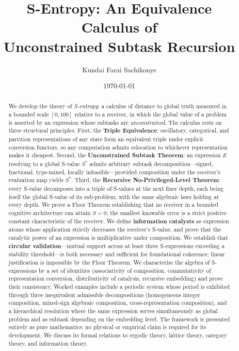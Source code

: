 \documentclass[11pt,a4paper]{article}
\title{\Large\textbf{S-Entropy: An Equivalence Calculus of\\
Unconstrained Subtask Recursion}}
\author{Kundai Farai Sachikonye}
\date{\today}
\theoremstyle{thmstyle}
\theoremstyle{thmstyle}
\theoremstyle{definition}
\theoremstyle{remark}
\newcommand{\Sscalar}{S}
\begin{document}
\maketitle

\begin{abstract}
We develop the theory of \emph{S-entropy}: a calculus of
distance to global truth measured in a bounded scale $[0,100]$
relative to a receiver, in which the global value of a problem
is asserted by an expression whose subtasks are \emph{unconstrained}.
The calculus rests on three structural principles. First, the
\textbf{Triple Equivalence}: oscillatory, categorical, and
partition representations of any state form an equivalent
triple under explicit conversion functors, so any computation
admits relocation to whichever representation makes it cheapest.
Second, the \textbf{Unconstrained Subtask Theorem}: an expression
$E$ resolving to a global S-value $\Sscalar^{*}$ admits arbitrary
subtask decomposition---signed, fractional, type-mixed,
locally infeasible---provided composition under the receiver's
evaluation map yields $\Sscalar^{*}$. Third, the
\textbf{Recursive No-Privileged-Level Theorem}: every S-value
decomposes into a triple of S-values at the next finer depth,
each being itself the global S-value of its sub-problem,
with the same algebraic laws holding at every depth. We
prove a Floor Theorem establishing that no receiver in a
bounded cognitive architecture can attain $\Sscalar = 0$;
the smallest knowable error is a strict positive constant
characteristic of the receiver. We define
\textbf{information catalysts} as expression atoms whose
application strictly decreases the receiver's S-value,
and prove that the catalytic power of an expression is
multiplicative under composition. We establish that
\textbf{circular validation}---mutual support across at
least three S-expressions exceeding a stability threshold---is
both necessary and sufficient for foundational coherence;
linear justification is impossible by the Floor Theorem.
We characterise the algebra of S-expressions by a set
of identities (associativity of composition, commutativity
of representation conversion, distributivity of catalysis,
recursive embedding) and prove their consistency. Worked
examples include a periodic system whose period is exhibited
through three inequivalent admissible decompositions
(homogeneous integer composition, mixed-sign algebraic
composition, cross-representation composition), and a
hierarchical resolution where the same expression serves
simultaneously as global problem and as subtask depending
on the embedding level. The framework is presented entirely
as pure mathematics; no physical or empirical claim
is required for its development. We discuss its formal
relations to ergodic theory, lattice theory, category
theory, and information theory.
\end{abstract}
\end{document}
